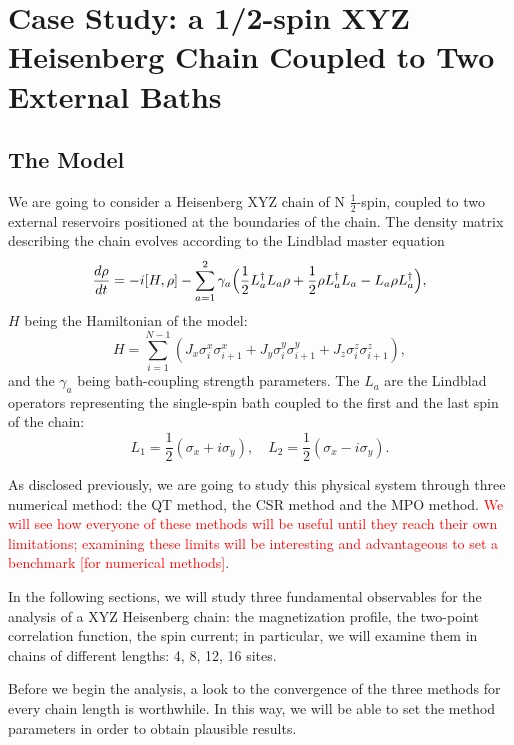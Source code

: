 \chapter{Case Study: a 1/2-spin XYZ Heisenberg Chain Coupled to Two External Baths}
\label{Chapter3}

\section{The Model}
We are going to consider a Heisenberg XYZ chain of N $\frac{1}{2}$-spin, coupled to two external reservoirs positioned at the boundaries of the chain. The density matrix describing the chain evolves according to the Lindblad master equation
\begin{equation}
    \frac{d\rho}{dt} = -i[H, \rho] - \sum_{a=1}^{2}\gamma_a\Bigl(\frac{1}{2}L_a^{\dagger}L_a\rho + \frac{1}{2}\rho L_a^{\dagger}L_a - L_a\rho L_a^{\dagger}\Bigl),
\end{equation}
$H$ being the Hamiltonian of the model:
\begin{equation}
\label{ham_chain}
    H = \sum_{i = 1}^{N-1} (J_x \sigma_i^x \sigma_{i+1}^x + J_y \sigma_i^y \sigma_{i+1}^y + J_z \sigma_i^z \sigma_{i+1}^z),
\end{equation}
and the $\gamma_a$ being bath-coupling strength parameters. The $L_a$ are the Lindblad operators representing the single-spin bath coupled to the first and the last spin of the chain:
\begin{equation}
\label{dissipators}
    L_1 = \frac{1}{2}(\sigma_x + i\sigma_y), \quad L_2 = \frac{1}{2}(\sigma_x - i\sigma_y).
\end{equation}

As disclosed previously, we are going to study this physical system through three numerical method: the QT method, the CSR method and the MPO method. \textcolor{red}{We will see how everyone of these methods will be useful until they reach their own limitations; examining these limits will be interesting and advantageous to set a benchmark [for numerical methods]}.

In the following sections, we will study three fundamental observables for the analysis of a XYZ Heisenberg chain: the magnetization profile, the two-point correlation function, the spin current; in particular, we will examine them in chains of different lengths: 4, 8, 12, 16 sites. 

Before we begin the analysis, a look to the convergence of the three methods for every chain length is worthwhile. In this way, we will be able to set the method parameters in order to obtain  plausible results.

